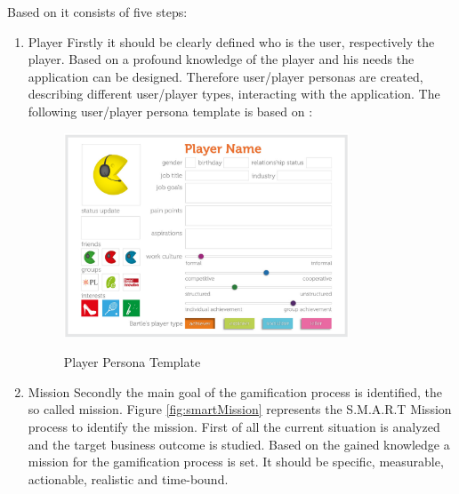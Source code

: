 Based on \cite[p. 29-32]{kumarGamificationWorkDesigning2013} it consists of five steps:
\begin{enumerate}
	\item Player \newline
	Firstly it should be clearly defined who is the user, respectively the player. Based on a profound knowledge of the player and his needs the application can be designed. Therefore user/player personas are created, describing different user/player types, interacting with the application. The following user/player persona template is based on \cite[p. 38-45]{kumarGamificationWorkDesigning2013}:

	\begin{figure}[htbp] 
		\centering
		\includegraphics[width=0.8\textwidth]{Content/Theory/PlayerPersona.png}
		\caption{Player Persona Template}
		\cite[p. 46]{kumarGamificationWorkDesigning2013}
		\label{fig:playerPersonaTemplate}
	\end{figure}
	
	\item Mission \newline
	Secondly the main goal of the gamification process is identified, the so called mission. Figure \ref{fig:smartMission} represents the S.M.A.R.T Mission process to identify the mission. First of all the current situation is analyzed and the target business outcome is studied. Based on the gained knowledge a mission for the gamification process is set. It should be specific, measurable, actionable, realistic and time-bound. \cite[p. 49-52]{kumarGamificationWorkDesigning2013}
	

\end{enumerate}
